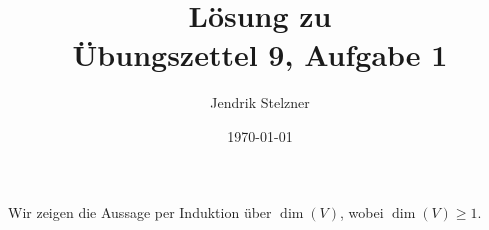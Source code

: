 \documentclass[a4paper,10pt]{scrartcl}
\title{Lösung zu \\ Übungszettel 9, Aufgabe 1}
\author{Jendrik Stelzner}
\date{\today}
\begin{document}
\maketitle










\section{}





\subsection{}
Wir zeigen die Aussage per Induktion über $\dim(V)$, wobei $\dim(V) \geq 1$.
\end{document}
